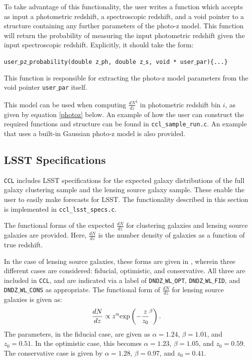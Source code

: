 \documentclass[\docopts]{\docclass}
\newcommand{\ccl}{{\tt CCL}\xspace}
\begin{document}
To take advantage of this functionality, the user writes a function which accepts as input a photometric redshift, a spectroscopic redshift, and a void pointer to a structure containing any further parameters of the photo-z model. This function will return the probability of measuring the input photometric redshift given the input spectroscopic redshift. Explicitly, it should take the form:

{\tt user$\_$pz$\_$probability(double z$\_$ph, double z$\_$s, void * user$\_$par)\{...\}}

This function is responsible for extracting the photo-z model parameters from the void pointer {\tt user$\_$par} itself.

This model can be used when computing $\frac{dN}{dz}^i$ in photometric redshift bin $i$, as given by equation \ref{photoz} below. An example of how the user can construct the required functions and structure can be found in {\tt ccl\_sample\_run.c}. An example that uses a built-in Gaussian photo-z model is also provided.

\subsection{LSST Specifications}
\label{sec:specs}

\ccl includes LSST specifications for the expected galaxy distributions of the full galaxy clustering sample and the lensing source galaxy sample. These enable the user to easily make forecasts for LSST. The functionality described in this section is implemented in {\tt ccl\_lsst\_specs.c}.

The functional forms of the expected $\frac{dN}{dz}$ for clustering galaxies and lensing source galaxies are provided. Here, $\frac{dN}{dz}$ is the number density of galaxies as a function of true redshift.

In the case of lensing source galaxies, these forms are given in \cite{Chang2013}, wherein three different cases are considered: fiducial, optimistic, and conservative. All three are included in \ccl, and are indicated via a label of {\tt DNDZ$\_$WL$\_$OPT}, {\tt DNDZ$\_$WL$\_$FID}, and {\tt DNDZ$\_$WL$\_$CONS} as appropriate. The functional form of $\frac{dN}{dz}$ for lensing source galaxies is given as:
\begin{equation}
\frac{dN}{dz} \propto z^\alpha {\rm exp}\left(-\frac{z}{z_0}^\beta\right).
\label{dndz_src}
\end{equation}
The parameters, in the fiducial case, are given as $\alpha=1.24$, $\beta=1.01$, and $z_0=0.51$. In the optimistic case, this becomes $\alpha=1.23$, $\beta=1.05$, and $z_0=0.59$. The conservative case is given by $\alpha=1.28$, $\beta=0.97$, and $z_0=0.41$.
\end{document}
